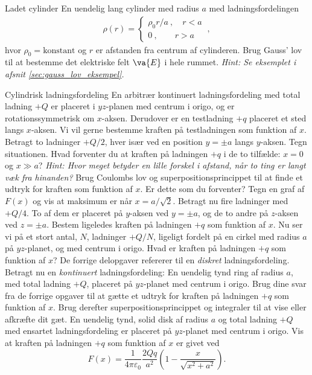 \begin{opgave}{Ladet cylinder}
    En uendelig lang cylinder med radius $a$ med ladningsfordelingen
    \begin{align*}
        \rho(r) = \begin{cases}
        \rho_0r/a \: , \quad r<a \\
        0 \: , \qquad r>a
        \end{cases} \: ,
    \end{align*}
    hvor $\rho_0=\text{konstant}$ og $r$ er afstanden fra centrum af cylinderen.
    \opg Brug Gauss' lov til at bestemme det elektriske felt $\va {E}$ i hele rummet.
    \textit{Hint: Se eksemplet i afsnit \ref{sec:gauss_lov_eksempel}.}
\end{opgave}

\begin{opgave}{Cylindrisk ladningsfordeling}
    En arbitrær kontinuert ladningsfordeling med total ladning $+Q$ er placeret i $yz$-planen med centrum i origo, og er rotationssymmetrisk om $x$-aksen. Derudover er en testladning $+q$ placeret et sted langs $x$-aksen. Vi vil gerne bestemme kraften på testladningen som funktion af $x$.
    \opg Betragt to ladninger $+Q/2$, hver især ved en position $y=\pm a$ langs $y$-aksen. Tegn situationen.
    \opg Hvad forventer du at kraften på ladningen $+q$ i de to tilfælde: $x=0$ og $x\gg a$? \textit{Hint: Hvor meget betyder en lille forskel i afstand, når to ting er langt væk fra hinanden?}
    \opg Brug Coulombs lov og superpositionsprincippet til at finde et udtryk for kraften som funktion af $x$.
    \opg Er dette som du forventer? Tegn en graf af $F(x)$ og vis at maksimum er når $x=a/\sqrt{2}$.
    \opg Betragt nu fire ladninger med $+Q/4$. To af dem er placeret på $y$-aksen ved $y=\pm a$, og de to andre på $z$-aksen ved $z=\pm a$. Bestem ligeledes kraften på ladningen $+q$ som funktion af $x$.
    \opg Nu ser vi på et stort antal, $N$, ladninger $+Q/N$, ligeligt fordelt på en cirkel med radius $a$ på $yz$-planet, og med centrum i origo. Hvad er kraften på ladningen $+q$ som funktion af $x$?
    \opg De forrige delopgaver refererer til en \emph{diskret} ladningsfordeling. Betragt nu en \emph{kontinuert} ladningsfordeling: En uendelig tynd ring af radius $a$, med total ladning $+Q$, placeret på $yz$-planet med centrum i origo. Brug dine svar fra de forrige opgaver til at gætte et udtryk for kraften på ladningen $+q$ som funktion af $x$. Brug derefter superpositionsprincippet og integraler til at vise eller afkræfte dit gæt.
    \opg En uendelig tynd, solid disk af radius $a$ og total ladning $+Q$ med ensartet ladningsfordeling er placeret på $yz$-planet med centrum i origo. Vis at kraften på ladningen $+q$ som funktion af $x$ er givet ved
    \[ F(x)=\frac{1}{4\pi\varepsilon_0}\frac{2Qq}{a^2}\left(1-\frac{x}{\sqrt{x^2+a^2}}\right). \]
\end{opgave}

